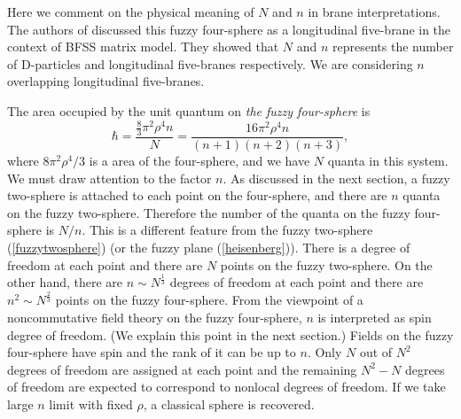 \documentclass[a4paper,11pt]{article}
\begin{document}
Here we comment on the physical meaning of $N$ and $n$ 
in brane interpretations. 
The authors of \cite{castelino} 
discussed this fuzzy four-sphere as 
a longitudinal five-brane in the context of 
BFSS matrix model. 
They showed that 
$N$ and $n$ represents the number of D-particles and 
longitudinal five-branes respectively. 
We are considering $n$ overlapping longitudinal five-branes.

The area occupied by the unit quantum 
on {\it the fuzzy four-sphere} is 
\begin{equation}
\hbar=\frac{\frac{8}{3}\pi^{2}\rho^{4} n}{N}
=\frac{16\pi^{2}\rho^{4}n}{(n+1)(n+2)(n+3)}, 
\end{equation}
where $8\pi^{2}\rho^{4}/3$ is a area of the four-sphere, and 
we have $N$ quanta in this system. 
We must draw attention to the factor $n$. 
As discussed in the next section, a fuzzy two-sphere 
is attached to each point on the four-sphere\cite{horamgooram}, 
and there are $n$ quanta on the fuzzy two-sphere. 
Therefore the number of the quanta on the fuzzy four-sphere 
is $N/n$. 
This is a different feature from 
the fuzzy two-sphere (\ref{fuzzytwosphere})
(or the fuzzy plane (\ref{heisenberg})). 
There is a degree of freedom 
at each point and there are 
$N$ points  on the fuzzy two-sphere. On the other hand, 
there are $n \sim N^{\frac{1}{3}}$  
degrees of freedom at each point and 
there are $n^{2} \sim N^{\frac{2}{3}}$ points on the 
fuzzy four-sphere. 
From the viewpoint of a noncommutative field theory 
on the fuzzy four-sphere, 
$n$ is interpreted as spin degree of freedom. 
(We explain this point in the next section.) 
Fields on the fuzzy four-sphere 
have spin and the rank of it can be up to $n$. 
Only $N$ out of $N^{2}$ degrees of freedom are assigned at each 
point and the remaining $N^{2}-N$ degrees of freedom 
are expected to correspond to nonlocal degrees of freedom. 
If we take large $n$ limit with fixed $\rho$, a classical 
sphere is recovered. 
\end{document}
